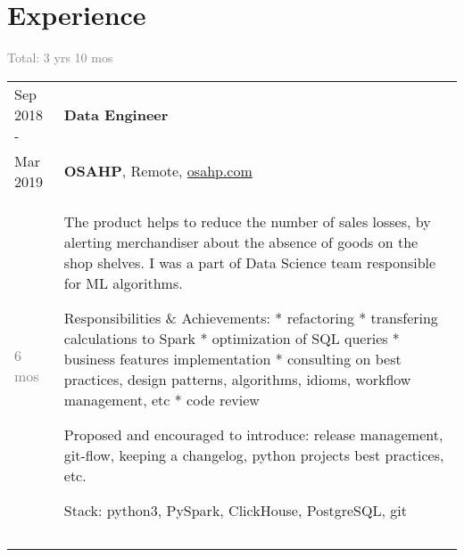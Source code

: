 \documentclass[a4paper,10pt]{article}
\begin{document}
\section{Experience}
\textcolor{gray}{Total: 3 yrs 10 mos}
\begin{tabularx}{\textwidth}{lX}
    Sep 2018 -              &   \textbf{Data Engineer} \\
    Mar 2019                &   \textbf{OSAHP}, Remote,
                                \href{osahp.com}{osahp.com} \\
    \textcolor{gray}
    {6 mos}
                            &   \footnotesize{

                                    The product helps to reduce the number of sales losses, by alerting merchandiser about the absence of goods on the shop shelves.\newline
                                    I was a part of Data Science team responsible for ML algorithms.\newline

                                    Responsibilities \& Achievements:\newline
                                    * refactoring\newline
                                    * transfering calculations to Spark\newline
                                    * optimization of SQL queries\newline
                                    * business features implementation\newline
                                    * consulting on best practices, design patterns, algorithms, idioms, workflow management, etc\newline
                                    * code review\newline

                                    Proposed and encouraged to introduce: release management, git-flow, keeping a changelog, python projects best practices, etc.\newline

                                    Stack: python3, PySpark, ClickHouse, PostgreSQL, git
                                } \\

\multicolumn{2}{c}{}\\\\


\end{tabularx}
\end{document}
